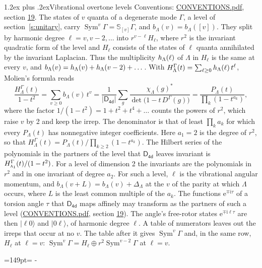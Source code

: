 \documentclass[10pt,a4paper]{article}
\makeatletter
\renewcommand\section{\@startsection{section}{1}{\z@}{-3ex plus -1ex minus -.2ex}%
  {1.2ex plus .2ex}{\normalfont\large\sffamily\bfseries\color{parttitle}}}
\newcommand{\needspace}[1]{\par\penalty-100\begingroup\dimen0=#1\relax\dimen2=\pagegoal
  \advance\dimen2-\pagetotal\ifdim\dimen0>\dimen2\relax\ifdim\dimen2>0pt\vfil\break\fi\fi
  \endgroup}
\numberwithin{equation}{section}
\newcommand{\grp}[1]{\mathsf{#1}}
\newcommand{\irr}[1]{\text{\normalfont\scshape #1}}
\newcommand{\iunit}{\mathrm{i}}
\newcommand{\expe}{\mathrm{e}}
\newcommand{\repD}[1]{D^{#1}}
\newcommand{\irchar}[1]{\chi_{#1}}
\newcommand{\conj}[1]{{#1}^{*}}
\newcommand{\schur}[1]{\mathbb{S}_{#1}}
\newcommand{\shape}[1]{[#1]}
\newcommand{\occ}[1]{\lvert #1\rangle}
\makeatother
\begin{document}
\section{Vibrational overtone levels}\label{s:overtones}
Conventions: \href{../../CONVENTIONS.pdf}{CONVENTIONS.pdf}, section \href{../../CONVENTIONS.pdf\#conv.19}{19}.
\leavevmode\label{n:index.quanta}\label{n:operator.symmetric.power}The states of $v$ quanta of a degenerate mode $\Gamma$, a level of section~\ref{s:unitary}, carry $\operatorname{Sym}^{v}\Gamma = \schur{\shape{v}}\Gamma$, and $b_\Lambda(v) = b_\Lambda(\shape{v})$. \label{n:local.quadratic.form}\label{n:set.harmonic}They split by harmonic degree $\ell = v, v - 2, \dots$ into $r^{v-\ell}H_\ell$, where $r^2$ is the invariant quadratic form of the level and $H_\ell$ consists of the states of $\ell$ quanta annihilated by the invariant Laplacian. \label{n:function.multiplicity.harmonic}Thus the multiplicity $\mathnormal{h}_\Lambda(\ell)$ of $\Lambda$ in $H_\ell$ is the same at every $v$, and $b_\Lambda(v) = \mathnormal{h}_\Lambda(v) + \mathnormal{h}_\Lambda(v - 2) + \dots$. \label{n:function.generating.level}With $H^{\Gamma}_\Lambda(t) = \sum_{\ell\ge0} \mathnormal{h}_\Lambda(\ell)\,t^{\ell}$, Molien's formula reads
\begin{equation}\label{e:molien}\frac{H^{\Gamma}_\Lambda(t)}{1 - t^2} = \sum_{v\ge0} b_\Lambda(v)\,t^v = \frac{1}{|\grp{D_{4d}}|}\sum_{g}\frac{\conj{\irchar{\Lambda}(g)}}{\det\bigl(1 - t\,\repD{\Gamma}(g)\bigr)} = \frac{P_\Lambda(t)}{\prod_k (1-t^{a_k})},\end{equation}
where the factor $1/(1 - t^2) = 1 + t^2 + t^4 + \dots$ counts the powers of $r^2$, which raise $v$ by 2 and keep the irrep. The denominator is that of least $\prod_k a_k$ for which every $P_\Lambda(t)$ has nonnegative integer coefficients. Here $a_1 = 2$ is the degree of $r^2$, so that $H^{\Gamma}_\Lambda(t) = P_\Lambda(t)/\prod_{k\ge2}(1 - t^{a_k})$. The Hilbert series of the polynomials in the partners of the level that $\grp{D_{4d}}$ leaves invariant is $H^{\Gamma}_{\irr{a}_{1}}(t)/(1 - t^2)$. For a level of dimension 2 the invariants are the polynomials in $r^2$ and in one invariant of degree $a_2$. \label{n:index.overtone.period}\label{n:index.increment.unitary}For such a level, $\ell$ is the vibrational angular momentum, and $b_\Lambda(v + L) = b_\Lambda(v) + \Delta_\Lambda$ at the $v$ of the parity at which $\Lambda$ occurs, where $L$ is the least common multiple of the $a_k$. \label{n:local.torsion.angle}The functions $\expe^{\mp\iunit\tau}$ of a torsion angle $\tau$ that $\grp{D_{4d}}$ maps affinely may transform as the partners of such a level (\href{../../CONVENTIONS.pdf}{CONVENTIONS.pdf}, section \href{../../CONVENTIONS.pdf\#conv.19}{19}). The angle's free-rotor states $\expe^{\mp\iunit\ell\tau}$ are then $\occ{\ell 0}$ and $\occ{0 \ell}$, of harmonic degree $\ell$. A table of numerators leaves out the irreps that occur at no $v$. The table after it gives $\operatorname{Sym}^{v}\Gamma$ and, in the same row, $H_\ell$ at $\ell = v$: $\operatorname{Sym}^{v}\Gamma = H_\ell \oplus r^2\operatorname{Sym}^{v-2}\Gamma$ at $\ell = v$.
\needspace{149pt}
\end{document}
